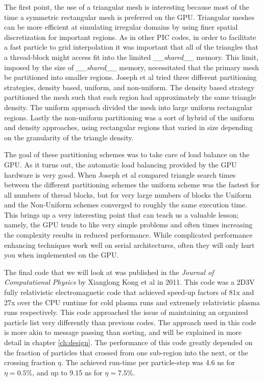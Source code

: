 The first point, the use of a triangular mesh is interesting because most of the time a symmetric rectangular mesh is preferred on the GPU. Triangular meshes can be more efficient at simulating irregular domains by using finer spatial discretization for important regions.  As in other PIC codes, in order to facilitate a fast particle to grid interpolation it was important that all of the triangles that a thread-block might access fit into the limited \emph{\_\_shared\_\_} memory. This limit, imposed by the size of \emph{\_\_shared\_\_} memory, necessitated that the primary mesh be partitioned into smaller regions. Joseph et al tried three different partitioning strategies, density based, uniform, and non-uniform. The density based strategy partitioned the mesh such that each region had approximately the same triangle density. The uniform approach divided the mesh into large uniform rectangular regions. Lastly the non-uniform partitioning was a sort of hybrid of the uniform and density approaches, using rectangular regions that varied in size depending on the granularity of the triangle density.\cite{Joseph2011}

The goal of these partitioning schemes was to take care of load balance on the GPU. As it turns out, the automatic load balancing provided by the GPU hardware is very good. When Joseph et al compared triangle search times between the different partitioning schemes the uniform scheme was the fastest for all numbers of thread blocks, but for very large numbers of blocks the Uniform and the Non-Uniform schemes converged to roughly the same execution time. This brings up a very interesting point that can teach us a valuable lesson; namely, the GPU tends to like very simple problems and often times increasing the complexity results in reduced performance. While complicated performance enhancing techniques work well on serial architectures, often they will only hurt you when implemented on the GPU. 

The final code that we will look at was published in the \emph{Journal of Computational Physics} by Xianglong Kong et al in 2011.\cite{Kong2011} This code was a 2D3V fully relativistic electromagnetic code that achieved speed-up factors of 81x and 27x over the CPU runtime for cold plasma runs and extremely relativistic plasma runs respectively. This code approached the issue of maintaining an organized particle list very differently than previous codes. The approach used in this code is more akin to message passing than sorting, and will be explained in more detail in chapter \ref{ch:design}. The performance of this code greatly depended on the fraction of particles that crossed from one sub-region into the next, or the crossing fraction $\eta$. The achieved run-time per particle-step was 4.6 ns for $\eta=0.5\%$, and up to 9.15 ns for $\eta=7.5\%$. 

